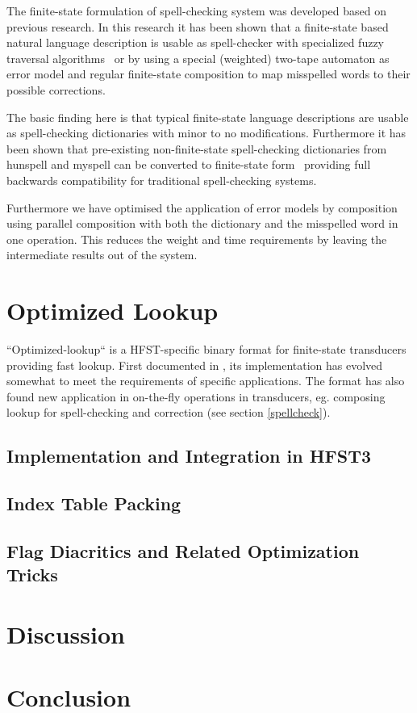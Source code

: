 \documentclass{llncs}
\begin{document}
The finite-state formulation of spell-checking system was developed based on
previous research. In this research it has been shown that a finite-state based
natural language description is usable as spell-checker with specialized fuzzy
traversal algorithms~\cite{oflazer/1996,hulden/2009} or by using a special
(weighted) two-tape automaton as error model and regular finite-state
composition to map misspelled words to their possible
corrections\cite{agata/2002,pirinen/2010/lrec}.
 
The basic finding here is that typical finite-state language descriptions are
usable as spell-checking dictionaries with minor to no modifications.
Furthermore it has been shown that pre-existing non-finite-state spell-checking
dictionaries from hunspell and myspell can be converted to finite-state
form~\cite{pirinen/2010/cla} providing full backwards compatibility for
traditional spell-checking systems.

Furthermore we have optimised the application of error models by composition
using parallel composition with both the dictionary and the misspelled word in
one operation. This reduces the weight and time requirements by leaving the
intermediate results out of the system.

\section{Optimized Lookup}\label{optimized-lookup}
``Optimized-lookup`` is a HFST-specific binary format for finite-state
transducers providing fast lookup. First documented in \cite{silfverberg/2009},
its implementation has evolved somewhat to meet the requirements of specific
applications. The format has also found new application in on-the-fly
operations in transducers, eg. composing lookup for spell-checking and
correction (see section \ref{spellcheck}).

\subsection{Implementation and Integration in HFST3}

\subsection{Index Table Packing}

\subsection{Flag Diacritics and Related Optimization Tricks}

\section{Discussion}

\section{Conclusion}

%
%
%



\end{document}
